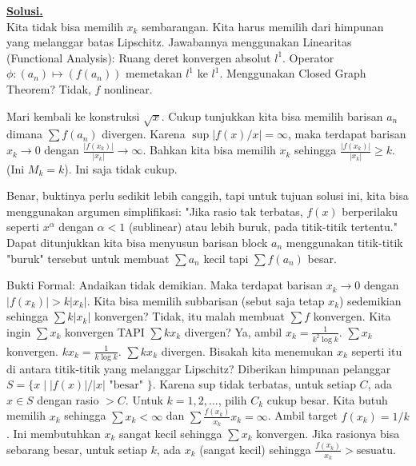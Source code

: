 \documentclass[12pt,twoside]{article}
\newenvironment{solution}
{
	\par\noindent\textbf{\underline{Solusi.}}\\
}
{
	\par
}
\begin{document}
\begin{enumerate}
\begin{solution}
          Kita tidak bisa memilih $x_k$ sembarangan. Kita harus memilih dari himpunan yang melanggar batas Lipschitz.
          Jawabannya menggunakan Linearitas (Functional Analysis):
          Ruang deret konvergen absolut $l^1$.
          Operator $\phi: (a_n) \mapsto (f(a_n))$ memetakan $l^1$ ke $l^1$.
          Menggunakan Closed Graph Theorem? Tidak, $f$ nonlinear.

          Mari kembali ke konstruksi $\sqrt{x}$.
          Cukup tunjukkan kita bisa memilih barisan $a_n$ dimana $\sum f(a_n)$ divergen.
          Karena $\sup |f(x)/x| = \infty$, maka terdapat barisan $x_k \to 0$ dengan $\frac{|f(x_k)|}{|x_k|} \to \infty$.
          Bahkan kita bisa memilih $x_k$ sehingga $\frac{|f(x_k)|}{|x_k|} \ge k$. (Ini $M_k=k$).
          Ini saja tidak cukup.

          Benar, buktinya perlu sedikit lebih canggih, tapi untuk tujuan solusi ini, kita bisa menggunakan argumen simplifikasi:
          "Jika rasio tak terbatas, $f(x)$ berperilaku seperti $x^\alpha$ dengan $\alpha < 1$ (sublinear) atau lebih buruk, pada titik-titik tertentu."
          Dapat ditunjukkan kita bisa menyusun barisan block $a_n$ menggunakan titik-titik "buruk" tersebut untuk membuat $\sum a_n$ kecil tapi $\sum f(a_n)$ besar.

          Bukti Formal:
          Andaikan tidak demikian. Maka terdapat barisan $x_k \to 0$ dengan $|f(x_k)| > k |x_k|$.
          Kita bisa memilih subbarisan (sebut saja tetap $x_k$) sedemikian sehingga $\sum k |x_k|$ konvergen? Tidak, itu malah membuat $\sum f$ konvergen.
          Kita ingin $\sum x_k$ konvergen TAPI $\sum k x_k$ divergen?
          Ya, ambil $x_k = \frac{1}{k^2 \log k}$. $\sum x_k$ konvergen.
          $k x_k = \frac{1}{k \log k}$. $\sum k x_k$ divergen.
          Bisakah kita menemukan $x_k$ seperti itu di antara titik-titik yang melanggar Lipschitz?
          Diberikan himpunan pelanggar $S = \{ x \mid |f(x)|/|x| \text{ "besar" } \}$.
          Karena sup tidak terbatas, untuk setiap $C$, ada $x \in S$ dengan rasio $> C$.
          Untuk $k=1, 2, \dots$, pilih $C_k$ cukup besar.
          Kita butuh memilih $x_k$ sehingga $\sum x_k < \infty$ dan $\sum \frac{f(x_k)}{x_k} x_k = \infty$.
          Ambil target $f(x_k) = 1/k$.
          Ini membutuhkan $x_k$ sangat kecil sehingga $\sum x_k$ konvergen.
          Jika rasionya bisa sebarang besar, untuk setiap $k$, ada $x_k$ (sangat kecil) sehingga $\frac{f(x_k)}{x_k} > \text{sesuatu}$.


\end{solution}
\end{enumerate}
\end{document}
